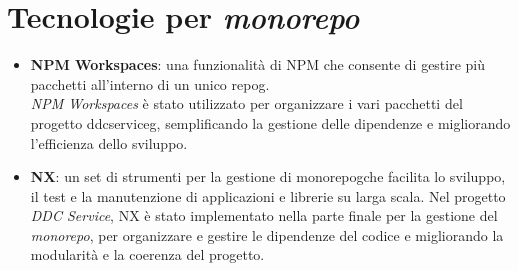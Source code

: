 \section{Tecnologie per \textit{monorepo}}
\begin{itemize}
\item \textbf{NPM Workspaces}: una funzionalità di NPM che consente di gestire più pacchetti all'interno di un unico \gls{repog}\glox.
\\\textit{NPM Workspaces} è stato utilizzato per organizzare i vari pacchetti del progetto \gls{ddcserviceg}\glox, semplificando la gestione delle dipendenze e migliorando l'efficienza dello sviluppo.
\item \textbf{NX}: un set di strumenti per la gestione di \gls{monorepog}\glox che facilita lo sviluppo, il test e la manutenzione di applicazioni e librerie su larga scala.
Nel progetto \textit{DDC Service}, NX è stato implementato nella parte finale per la gestione del \textit{monorepo}, per organizzare e gestire le dipendenze del codice e migliorando la modularità e la coerenza del progetto.
\end{itemize}

